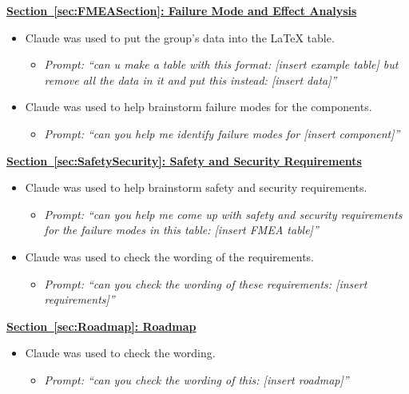 \documentclass{article}
\begin{document}
\textbf{\hyperref[sec:FMEASection]{Section~\ref*{sec:FMEASection}: Failure Mode and Effect Analysis}}
\begin{itemize}
  \item Claude was used to put the group's data into the \LaTeX{} table.
  \begin{itemize}
    \item \textit{Prompt: ``can u make a table with this format: [insert example table] but remove all the data in it and put this instead: [insert data]''}
  \end{itemize}
  \item Claude was used to help brainstorm failure modes for the components.
  \begin{itemize}
    \item \textit{Prompt: ``can you help me identify failure modes for [insert component]''}
  \end{itemize}
\end{itemize}

\textbf{\hyperref[sec:SafetySecurity]{Section~\ref*{sec:SafetySecurity}: Safety and Security Requirements}}
\begin{itemize}
  \item Claude was used to help brainstorm safety and security requirements.
  \begin{itemize}
    \item \textit{Prompt: ``can you help me come up with safety and security requirements for the failure modes in this table: [insert FMEA table]''}
  \end{itemize}
  \item Claude was used to check the wording of the requirements.
  \begin{itemize}
    \item \textit{Prompt: ``can you check the wording of these requirements: [insert requirements]''}
  \end{itemize}
\end{itemize}

\textbf{\hyperref[sec:Roadmap]{Section~\ref*{sec:Roadmap}: Roadmap}}
\begin{itemize}
  \item Claude was used to check the wording.
  \begin{itemize}
    \item \textit{Prompt: ``can you check the wording of this: [insert roadmap]''}
  \end{itemize}
\end{itemize}
\end{document}
